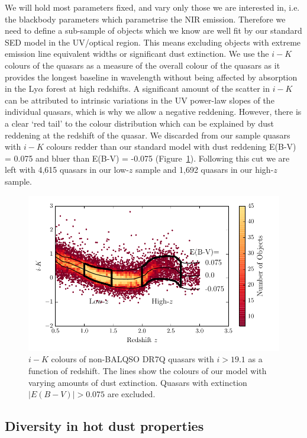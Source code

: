 We will hold most parameters fixed, and vary only those we are interested in, i.e. the blackbody parameters which parametrise the NIR emission. 
Therefore we need to define a sub-sample of objects which we know are well fit by our standard SED model in the UV/optical region. 
This means excluding objects with extreme emission line equivalent widths or significant dust extinction.
We use the $i-K$ colours of the quasars as a measure of the overall colour of the quasars as it provides the longest baseline in wavelength without being affected by absorption in the Ly$\alpha$ forest at high redshifts. 
A significant amount of the scatter in $i-K$ can be attributed to intrinsic variations in the UV power-law slopes of the individual quasars, which is why we allow a negative reddening. 
However, there is a clear `red tail' to the colour distribution which can be explained by dust reddening at the redshift of the quasar.
We discarded from our sample quasars with $i - K$ colours redder than our standard model with dust reddening E(B-V) = 0.075 and bluer than E(B-V) = -0.075 (Figure~\ref{fig:ikzplot}). 
Following this cut we are left with 4,615 quasars in our low-$z$ sample and 1,692 quasars in our high-$z$ sample. 

\begin{figure}
  \centering
  \includegraphics[width=\columnwidth]{figures/chapter05/ik_versus_z_low_ext.pdf}
  \caption{$i-K$ colours of non-BALQSO DR7Q quasars with $i>19.1$ as a function of redshift. The lines show the colours of our model with varying amounts of dust extinction. Quasars with extinction $|E(B-V)|>0.075$ are excluded.}
  \label{fig:ikzplot}
\end{figure}

\subsection{Diversity in hot dust properties}

